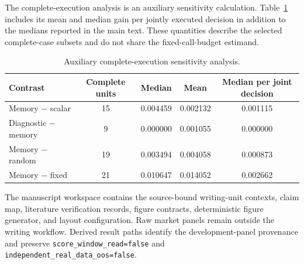 The complete-execution analysis is an auxiliary sensitivity calculation. Table~\ref{tab:complete} includes its mean and median gain per jointly executed decision in addition to the medians reported in the main text. These quantities describe the selected complete-case subsets and do not share the fixed-call-budget estimand.

\begin{table}[!htbp]
\caption{Auxiliary complete-execution sensitivity analysis.}
\label{tab:complete}
\centering
\ProjectCaption
\small
\begin{tabular}{lcccc}
\toprule
Contrast & Complete units & Median & Mean & Median per joint decision \\
\midrule
Memory $-$ scalar & 15 & 0.004459 & 0.002132 & 0.001115 \\
Diagnostic $-$ memory & 9 & 0.000000 & 0.001055 & 0.000000 \\
Memory $-$ random & 19 & 0.003494 & 0.004058 & 0.000873 \\
Memory $-$ fixed & 21 & 0.010647 & 0.014052 & 0.002662 \\
\bottomrule
\end{tabular}
\end{table}

The manuscript workspace contains the source-bound writing-unit contexts, claim map, literature verification records, figure contracts, deterministic figure generator, and layout configuration. Raw market panels remain outside the writing workflow. Derived result paths identify the development-panel provenance and preserve \texttt{score\_window\_read=false} and \texttt{independent\_real\_data\_oos=false}.
